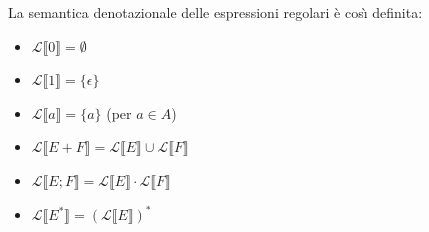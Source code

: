 		La semantica denotazionale delle espressioni regolari \`{e} cos\`{\i} definita:
		\begin{itemize}
		  \item $\mathcal{L} \llbracket 0 \rrbracket = \emptyset$
		  \item $\mathcal{L} \llbracket 1 \rrbracket = \{\epsilon\}$
		  \item $\mathcal{L} \llbracket a \rrbracket = \{a\}$ (per $a \in A$)
		  \item $\mathcal{L} \llbracket E + F \rrbracket = \mathcal{L} \llbracket E
		  	\rrbracket \cup \mathcal{L} \llbracket F
		  	\rrbracket$
		  \item $\mathcal{L} \llbracket E ; F \rrbracket = \mathcal{L} \llbracket E
		  	\rrbracket \cdot \mathcal{L} \llbracket F
		  	\rrbracket$ 
		  \item $\mathcal{L} \llbracket E^* \rrbracket = (\mathcal{L} \llbracket E
		  	\rrbracket)^*$ 
		\end{itemize}
		
